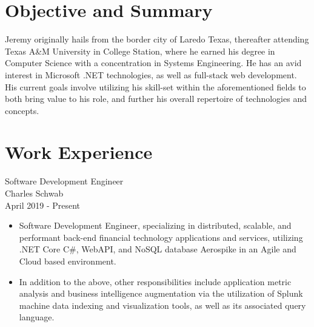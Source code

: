 \documentclass[11pt]{res} %
\begin{document}
 
 

\address{{\bf Current Address} \\   11011 Domain Drive \\   Austin, TX
         78758   \\ (956)286-8386}
\address{{\bf Contact Information} \\ jeremycantu.com \\ github.com/jac21 \\ mail@jeremycantu.com}
 
                                             
\begin{resume}
                                               
 
\section{Objective and Summary}
   Jeremy originally hails from the border city of Laredo Texas, thereafter attending Texas A\&M University in College Station, where he earned his degree in Computer Science with a concentration in Systems Engineering. He has an avid interest in Microsoft .NET technologies, as well as full-stack web development. His current goals involve utilizing his skill-set within the aforementioned fields to both bring value to his role, and further his overall repertoire of technologies and concepts.
 
\section{Work Experience}

Software Development Engineer \\
Charles Schwab \\
April 2019 - Present
\vspace{0.2in}
   \begin{itemize} \itemsep -2pt  %
   \item Software Development Engineer, specializing in distributed, scalable, and performant back-end financial technology applications and services, utilizing .NET Core C\#, WebAPI, and NoSQL database Aerospike in an Agile and Cloud based environment. 
\newline
    \item In addition to the above, other responsibilities include application metric analysis and business intelligence augmentation via the utilization of Splunk machine data indexing and visualization tools, as well as its associated query language.
 \end{itemize}


\end{resume}
\end{document}

